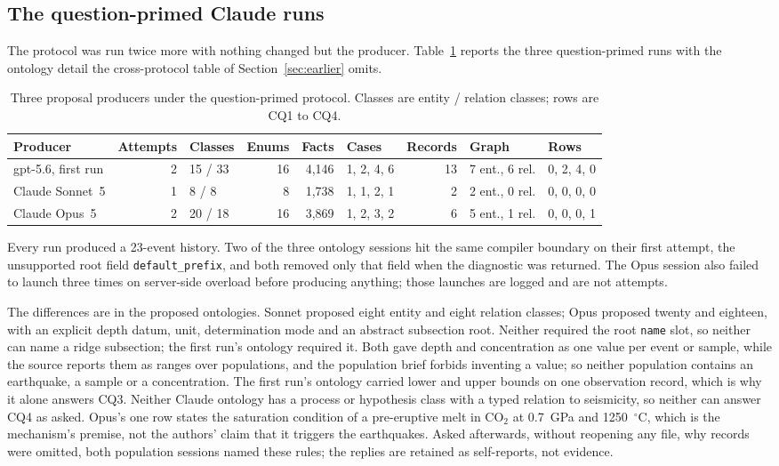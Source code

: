 \documentclass[10pt]{article}
\newcommand{\code}[1]{\texttt{#1}}
\begin{document}
\subsection{The question-primed Claude runs}
\label{app:b2}

The protocol was run twice more with nothing changed but the producer. Table~\ref{tab:producers} reports the three question-primed runs with the ontology detail the cross-protocol table of Section~\ref{sec:earlier} omits.

\begin{table}[h!]
\centering
\caption{Three proposal producers under the question-primed protocol. Classes are entity / relation classes; rows are CQ1 to CQ4.}
\label{tab:producers}
\small
\begin{tabular}{@{}l r l r r l r l l@{}}
\toprule
Producer & Attempts & Classes & Enums & Facts & Cases & Records & Graph & Rows \\
\midrule
gpt-5.6, first run & 2 & 15 / 33 & 16 & 4,146 & 1, 2, 4, 6 & 13 & 7 ent., 6 rel. & 0, 2, 4, 0 \\
Claude Sonnet~5 & 1 & 8 / 8 & 8 & 1,738 & 1, 1, 2, 1 & 2 & 2 ent., 0 rel. & 0, 0, 0, 0 \\
Claude Opus~5 & 2 & 20 / 18 & 16 & 3,869 & 1, 2, 3, 2 & 6 & 5 ent., 1 rel. & 0, 0, 0, 1 \\
\bottomrule
\end{tabular}
\end{table}

Every run produced a 23-event history. Two of the three ontology sessions hit the same compiler boundary on their first attempt, the unsupported root field \code{default\_prefix}, and both removed only that field when the diagnostic was returned. The Opus session also failed to launch three times on server-side overload before producing anything; those launches are logged and are not attempts.

The differences are in the proposed ontologies. Sonnet proposed eight entity and eight relation classes; Opus proposed twenty and eighteen, with an explicit depth datum, unit, determination mode and an abstract subsection root. Neither required the root \code{name} slot, so neither can name a ridge subsection; the first run's ontology required it. Both gave depth and concentration as one value per event or sample, while the source reports them as ranges over populations, and the population brief forbids inventing a value; so neither population contains an earthquake, a sample or a concentration. The first run's ontology carried lower and upper bounds on one observation record, which is why it alone answers CQ3. Neither Claude ontology has a process or hypothesis class with a typed relation to seismicity, so neither can answer CQ4 as asked. Opus's one row states the saturation condition of a pre-eruptive melt in CO$_2$ at 0.7~GPa and 1250~$^{\circ}$C, which is the mechanism's premise, not the authors' claim that it triggers the earthquakes. Asked afterwards, without reopening any file, why records were omitted, both population sessions named these rules; the replies are retained as self-reports, not evidence.
\end{document}

